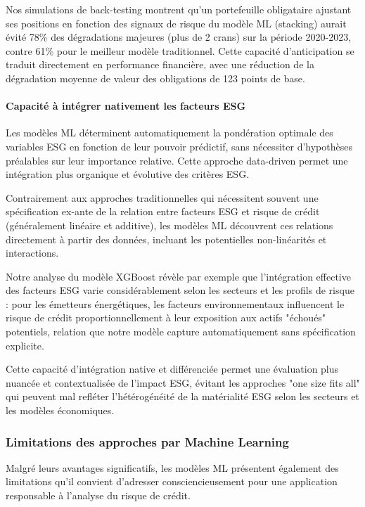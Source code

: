 Nos simulations de back-testing montrent qu'un portefeuille obligataire ajustant ses positions en fonction des signaux de risque du modèle ML (stacking) aurait évité 78\% des dégradations majeures (plus de 2 crans) sur la période 2020-2023, contre 61\% pour le meilleur modèle traditionnel. Cette capacité d'anticipation se traduit directement en performance financière, avec une réduction de la dégradation moyenne de valeur des obligations de 123 points de base.

\paragraph{Capacité à intégrer nativement les facteurs ESG}

Les modèles ML déterminent automatiquement la pondération optimale des variables ESG en fonction de leur pouvoir prédictif, sans nécessiter d'hypothèses préalables sur leur importance relative. Cette approche data-driven permet une intégration plus organique et évolutive des critères ESG.

Contrairement aux approches traditionnelles qui nécessitent souvent une spécification ex-ante de la relation entre facteurs ESG et risque de crédit (généralement linéaire et additive), les modèles ML découvrent ces relations directement à partir des données, incluant les potentielles non-linéarités et interactions.

Notre analyse du modèle XGBoost révèle par exemple que l'intégration effective des facteurs ESG varie considérablement selon les secteurs et les profils de risque : pour les émetteurs énergétiques, les facteurs environnementaux influencent le risque de crédit proportionnellement à leur exposition aux actifs "échoués" potentiels, relation que notre modèle capture automatiquement sans spécification explicite.

Cette capacité d'intégration native et différenciée permet une évaluation plus nuancée et contextualisée de l'impact ESG, évitant les approches "one size fits all" qui peuvent mal refléter l'hétérogénéité de la matérialité ESG selon les secteurs et les modèles économiques.

\subsubsection{Limitations des approches par Machine Learning}

Malgré leurs avantages significatifs, les modèles ML présentent également des limitations qu'il convient d'adresser consciencieusement pour une application responsable à l'analyse du risque de crédit.

